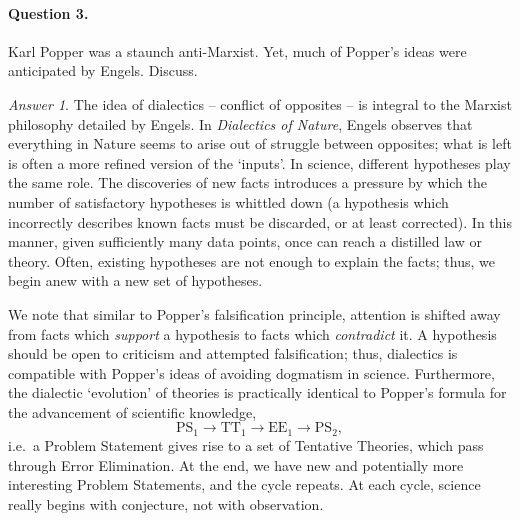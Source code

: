 \documentclass[11pt]{article}
\theoremstyle{remark}
\newtheorem*{answer}{Answer}
\begin{document}
    \paragraph{Question 3.} Karl Popper was a staunch anti-Marxist. Yet, much of
    Popper's ideas were anticipated by Engels. Discuss.

    \begin{answer}
        The idea of dialectics -- conflict of opposites -- is integral to the Marxist
        philosophy detailed by Engels. In \emph{Dialectics of Nature}, Engels
        observes that everything in Nature seems to arise out of struggle between
        opposites; what is left is often a more refined version of the `inputs'. In
        science, different hypotheses play the same role. The discoveries of new
        facts introduces a pressure by which the number of satisfactory hypotheses is
        whittled down (a hypothesis which incorrectly describes known facts must be
        discarded, or at least corrected). In this manner, given sufficiently many
        data points, once can reach a distilled law or theory. Often, existing
        hypotheses are not enough to explain the facts; thus, we begin anew with a
        new set of hypotheses.

        We note that similar to Popper's falsification principle, attention is
        shifted away from facts which \emph{support} a hypothesis to facts which
        \emph{contradict} it. A hypothesis should be open to criticism and attempted
        falsification; thus, dialectics is compatible with Popper's ideas of avoiding
        dogmatism in science. Furthermore, the dialectic `evolution' of theories is
        practically identical to Popper's formula for the advancement of scientific
        knowledge, \[
            \text{PS}_1 \to \text{TT}_1 \to \text{EE}_1 \to \text{PS}_2,
        \] i.e.\ a Problem Statement gives rise to a set of Tentative Theories, which
        pass through Error Elimination. At the end, we have new and potentially more
        interesting Problem Statements, and the cycle repeats. At each cycle, science
        really begins with conjecture, not with observation.


\end{answer}
\end{document}
